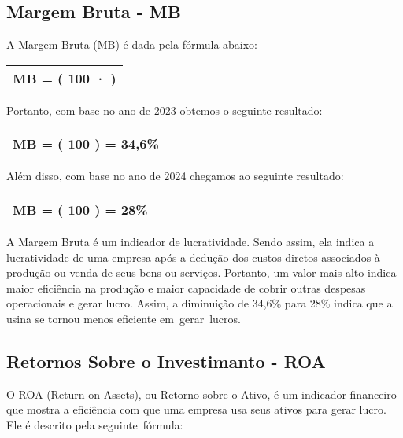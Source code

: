 \documentclass[1pt,a4paper]{article}
\begin{document}
	\subsection{Margem Bruta - MB}
	
	\hspace*{1.5cm} A Margem Bruta (MB) é dada pela fórmula abaixo:
		\begin{center}
			\begin{tabular}{|c|}
				\hline
				MB = \left( 100 · \left[ \frac{LUCRO \, BRUTO}{RECEITA \, LIQUIDA} \right] \right)  \\
				\hline
			\end{tabular}
		\end{center}
	Portanto, com base no ano de 2023 obtemos o seguinte resultado:
		\begin{center}
			\begin{tabular}{|c|}
				\hline
				MB = \left( 100  \left[ \frac{1.749.674}{4.376.917} \right] \right) = 34,6\% \\
				\hline
			\end{tabular}
		\end{center}
	Além disso, com base no ano de 2024 chegamos ao seguinte resultado:
		\begin{center}
			\begin{tabular}{|c|}
				\hline
				MB = \left( 100  \left[ \frac{1.384.286}{4.928.662} \right] \right) = 28\% \\
				\hline
			\end{tabular}
		\end{center}
		
	A Margem Bruta é um indicador de lucratividade. Sendo assim, ela indica a lucratividade de uma empresa após a dedução dos custos diretos associados à produção ou venda de seus bens ou serviços. Portanto, um valor mais alto indica maior eficiência na produção e maior capacidade de cobrir outras despesas operacionais e gerar lucro. Assim, a diminuição de 34,6\% para 28\% indica que a usina se tornou menos eficiente em gerar lucros.
		
	\subsection{Retornos Sobre o Investimanto - ROA}
	
	\hspace*{1.5cm} O ROA (Return on Assets), ou Retorno sobre o Ativo, é um indicador financeiro que mostra a eficiência com que uma empresa usa seus ativos para gerar lucro. Ele é descrito pela seguinte fórmula:
		
\end{document}
